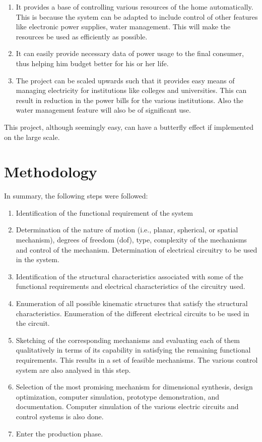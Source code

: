 \documentclass[oneside,notitlepage]{book}
\begin{document}
\begin{enumerate}
\item It provides a base of controlling various resources of the home automatically. This is because the system can be adapted to include control of other features like electronic power supplies, water management. This will make the resources be used as efficiently as possible.
\item It can easily provide necessary data of power usage to the final consumer, thus helping him budget better for his or her life.
\item The project can be scaled upwards such that it provides easy means of managing electricity for institutions like colleges and universities. This can result in reduction in the power bills for the various institutions. Also the water management feature will also be of significant use.
\end{enumerate}

This project, although seemingly easy, can have a butterfly effect if implemented on the large scale.

\chapter{Methodology}
In summary, the following steps were followed:\cite{Tsai}
\begin{enumerate}
\item Identification of the functional requirement of the system
\item Determination of the nature of motion (i.e., planar, spherical, or spatial mechanism), degrees of freedom (dof), type, complexity of the mechanisms and control of the mechanism. Determination of electrical circuitry to be used in the system.
\item Identification of the structural characteristics associated with some of the functional requirements and electrical characteristics of the circuitry used.
\item Enumeration of all possible kinematic structures that satisfy the structural characteristics. Enumeration of the different electrical circuits to be used in the circuit.
\item Sketching of the corresponding mechanisms and evaluating each of them qualitatively in terms of its capability in satisfying the remaining functional requirements. This results in a set of feasible mechanisms. The various control system are also analysed in this step.
\item Selection of the most promising mechanism for dimensional synthesis, design optimization, computer simulation, prototype demonstration, and documentation. Computer simulation of the various electric circuits and control systems is also done.
\item Enter the production phase.
\cite{Tsai}
\end{enumerate}
\end{document}

